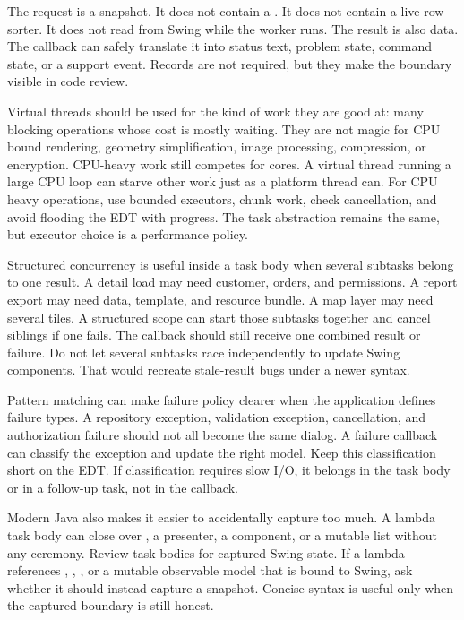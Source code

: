 The request is a snapshot. It does not contain a . It does not
contain a live row sorter. It does not read from Swing while the worker runs.
The result is also data. The callback can safely translate it into status text,
problem state, command state, or a support event. Records are not required, but
they make the boundary visible in code review.

Virtual threads should be used for the kind of work they are good at: many
blocking operations whose cost is mostly waiting. They are not magic for CPU
bound rendering, geometry simplification, image processing, compression, or
encryption. CPU-heavy work still competes for cores. A virtual thread running a
large CPU loop can starve other work just as a platform thread can. For CPU
heavy operations, use bounded executors, chunk work, check cancellation, and
avoid flooding the EDT with progress. The task abstraction remains the same,
but executor choice is a performance policy.

Structured concurrency is useful inside a task body when several subtasks
belong to one result. A detail load may need customer, orders, and permissions.
A report export may need data, template, and resource bundle. A map layer may
need several tiles. A structured scope can start those subtasks together and
cancel siblings if one fails. The callback should still receive one combined
result or failure. Do not let several subtasks race independently to update
Swing components. That would recreate stale-result bugs under a newer syntax.

Pattern matching can make failure policy clearer when the application defines
failure types. A repository exception, validation exception, cancellation, and
authorization failure should not all become the same dialog. A failure callback
can classify the exception and update the right model. Keep this classification
short on the EDT. If classification requires slow I/O, it belongs in the task
body or in a follow-up task, not in the callback.

Modern Java also makes it easier to accidentally capture too much. A lambda
task body can close over , a presenter, a component, or a mutable
list without any ceremony. Review task bodies for captured Swing state. If a
lambda references , , , or a mutable
observable model that is bound to Swing, ask whether it should instead capture
a snapshot. Concise syntax is useful only when the captured boundary is still
honest.

